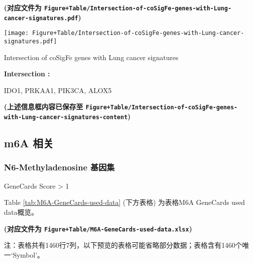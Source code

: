 \documentclass[
]{article}
\begin{document}
\textbf{(对应文件为 \texttt{Figure+Table/Intersection-of-coSigFe-genes-with-Lung-cancer-signatures.pdf})}

\def\@captype{figure}
\begin{center}
\texttt{[image: Figure+Table/Intersection-of-coSigFe-genes-with-Lung-cancer-signatures.pdf]}
\caption{Intersection of coSigFe genes with Lung cancer signatures}\label{fig:Intersection-of-coSigFe-genes-with-Lung-cancer-signatures}
\end{center}
\begin{center}\begin{tcolorbox}[colback=gray!10, colframe=gray!50, width=0.9\linewidth, arc=1mm, boxrule=0.5pt]
\textbf{
Intersection
:}

\vspace{0.5em}

    IDO1, PRKAA1, PIK3CA, ALOX5

\vspace{2em}
\end{tcolorbox}
\end{center}

\textbf{(上述信息框内容已保存至 \texttt{Figure+Table/Intersection-of-coSigFe-genes-with-Lung-cancer-signatures-content})}

\hypertarget{m6a-ux76f8ux5173}{%
\subsection{m6A 相关}\label{m6a-ux76f8ux5173}}

\hypertarget{n6-methyladenosine-ux57faux56e0ux96c6}{%
\subsubsection{N6-Methyladenosine 基因集}\label{n6-methyladenosine-ux57faux56e0ux96c6}}

GeneCards Score \textgreater{} 1

Table \ref{tab:M6A-GeneCards-used-data} (下方表格) 为表格M6A GeneCards used data概览。

\textbf{(对应文件为 \texttt{Figure+Table/M6A-GeneCards-used-data.xlsx})}

\begin{center}\begin{tcolorbox}[colback=gray!10, colframe=gray!50, width=0.9\linewidth, arc=1mm, boxrule=0.5pt]注：表格共有1460行7列，以下预览的表格可能省略部分数据；表格含有1460个唯一`Symbol'。
\end{tcolorbox}
\end{center}
\end{document}
